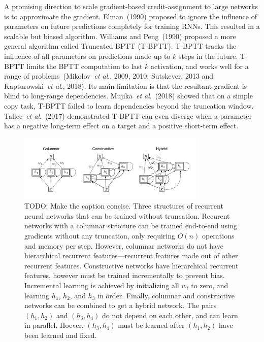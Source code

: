 \documentclass[twoside,11pt]{article}
\newcommand{\etal}{\textit{et al}.}
\begin{document}
A promising direction to scale gradient-based credit-assignment to large networks is to approximate the gradient. Elman~(1990) proposed to ignore the influence of parameters on future predictions completely for training RNNs. This resulted in a scalable but biased algorithm. Williams and Peng~(1990) proposed a more general algorithm called Truncated BPTT (T-BPTT). T-BPTT tracks the influence of all parameters on predictions made up to $k$ steps in the future. T-BPTT limits the BPTT computation to last $k$ activation, and works well for a range of problems~(Mikolov~\etal, 2009, 2010; Sutskever, 2013 and Kapturowski~\etal, 2018). Its main limitation is that the resultant gradient is blind to long-range dependencies. Mujika~\etal~(2018) showed that on a simple copy task, T-BPTT failed to learn dependencies beyond the truncation window. Tallec~\etal~(2017) demonstrated T-BPTT can even diverge when a parameter has a negative long-term effect on a target and a positive short-term effect. 

\begin{figure}
	\centering
	\includegraphics[width=0.8\textwidth]{figures/three_types}
	\caption{TODO: Make the caption concise. Three structures of recurrent neural networks that can be trained without truncation. Recurent networks with a columnar structure can be trained end-to-end using gradients without any truncation, only requiring $O(n)$ operations and memory per step. However, columnar networks do not have hierarchical recurrent features---recurrent features made out of other recurrent features. Constructive networks have hierarchical recurrent features, however must be trained incrementally to prevent bias. Incremental learning is achieved by initializing all $w_i$ to zero, and learning $h_1$, $h_2$, and $h_3$ in order. Finally, columnar and constructive networks can be combined to get a hybrid network. The pairs $(h_1, h_2)$ and $(h_3, h_4)$ do not depend on each other, and can learn in parallel. Hoever, $(h_3, h_4)$ must be learned after $(h_1, h_2)$ have been learned and fixed.}
\end{figure}
\end{document}
